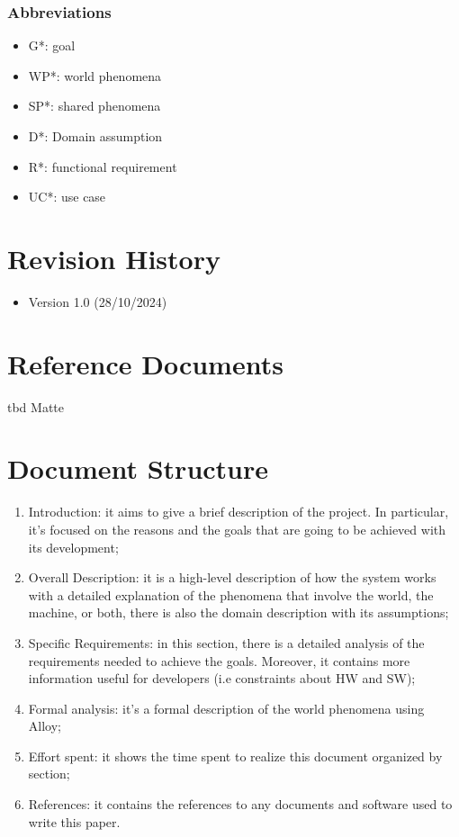 \subsubsection{Abbreviations}
\begin{itemize}
    \item G*: goal
    \item WP*: world phenomena
    \item SP*: shared phenomena
    \item D*: Domain assumption
    \item R*: functional requirement
    \item UC*: use case
\end{itemize}
  
\section{Revision History}

\begin{itemize}
    \item Version 1.0 (28/10/2024)
\end{itemize}

\section{Reference Documents}

tbd Matte


\section{Document Structure}

\begin{enumerate}
    \item  Introduction: it aims to give a brief description of the project. In particular, it’s focused on the reasons and the goals that are going to be achieved with its development;
 
    \item Overall Description: it is a high-level description of how the system works with a detailed explanation of the phenomena that involve the world, the machine, or both, there is also the domain description with its assumptions;
 
    \item Specific Requirements: in this section, there is a detailed analysis of the requirements needed to achieve the goals. Moreover, it contains more information useful for developers (i.e constraints about HW and SW);
    
    \item Formal analysis: it’s a formal description of the world phenomena using Alloy;

    \item  Effort spent: it shows the time spent to realize this document organized by section;

    \item  References: it contains the references to any documents and software used to write this paper.
    
\end{enumerate}